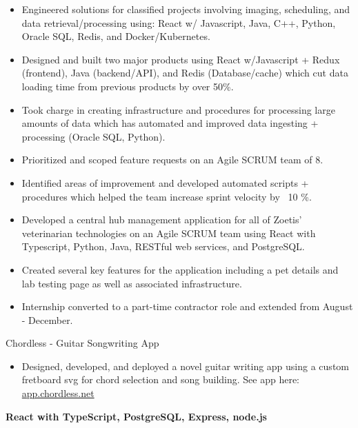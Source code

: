 \documentclass[10pt,a4paper,ragged2e,withhyper]{altacv}
\begin{document}
\begin{paracol}{2}

\begin{itemize}
\small\item Engineered solutions for classified projects involving imaging, scheduling, and data retrieval/processing using: React w/ Javascript, Java, C++, Python, Oracle SQL, Redis, and Docker/Kubernetes.
\item Designed and built two major products using React w/Javascript + Redux (frontend), Java (backend/API), and Redis (Database/cache) which cut data loading time from previous products by over 50\%.
\item Took charge in creating infrastructure and procedures for processing large amounts of data which has automated and improved data ingesting + processing (Oracle SQL, Python).
\item Prioritized and scoped feature requests on an Agile SCRUM team of 8.
\item Identified areas of improvement and developed automated scripts + procedures which helped the team increase sprint velocity by ~10 \%.
\end{itemize}

\divider

\begin{itemize}
\small\item Developed a central hub management application for all of Zoetis’ veterinarian technologies on an Agile SCRUM team using React with Typescript, Python, Java, RESTful web services, and PostgreSQL.
\item Created several key features for the application including a pet details and lab testing page as well as associated infrastructure.
\item Internship converted to a part-time contractor role and extended from August - December.
\end{itemize}


\large{Chordless - Guitar Songwriting App}
\begin{itemize}
\small\item {Designed, developed, and deployed a novel guitar writing app using a custom fretboard svg for chord selection and song building. \break See app here: \color{PastelRed}\href{https://app.chordless.net/}{app.chordless.net}}
\end{itemize}
\small\textbf {React with TypeScript, PostgreSQL, Express, node.js}



\end{paracol}
\end{document}
